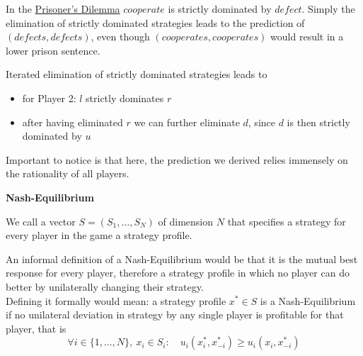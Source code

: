 In the \hyperref[prisonersdilemma]{Prisoner's Dilemma} $cooperate$ is strictly dominated by $defect$. Simply the elimination of strictly dominated strategies leads to the prediction of $(defects, defects)$, even though $(cooperates, cooperates)$ would result in a lower prison sentence.


\begin{example}
	Iterated elimination of strictly dominated strategies leads to
	\begin{itemize}
		\item for Player 2: $l$ strictly dominates $r$
		\item after having eliminated $r$ we can further eliminate $d$, since $d$ is then strictly dominated by $u$
	\end{itemize}
\end{example}

Important to notice is that here, the prediction we derived relies immensely on the rationality of all players.

\textbf{Nash-Equilibrium}

\begin{definition} \label{strategyprofile} 
	We call a vector $S = (S_{1}, \dotsc, S_{N})$ of dimension $N$ that specifies a strategy for every player in the game a strategy profile.
\end{definition}

\begin{definition} \label{nashequilibrium} 
	An informal definition of a Nash-Equilibrium would be that it is the mutual best response for every player, therefore a strategy profile in which no player can do better by unilaterally changing their strategy. \\
	Defining it formally would mean: a strategy profile $x^{*} \in S$ is a Nash-Equilibrium if no unilateral deviation in strategy by any single player is profitable for that player, that is
	\[ \forall i \in \{1, \dotsc, N \},~ x_{i} \in S_{i} : \quad u_{i}(x_{i}^{*}, x_{-i}^{*}) \geq u_{i}(x_{i}, x_{-i}^{*}) \]
	\end{definition}

